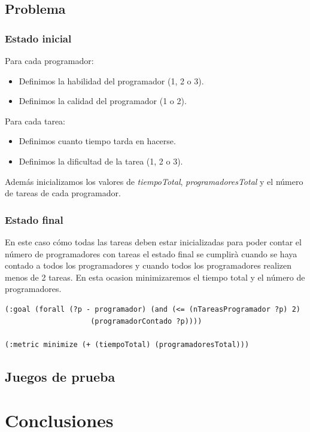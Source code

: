 \documentclass[11pt]{article}
\begin{document}
\subsection{Problema}
\subsubsection{Estado inicial}
Para cada programador:
\begin{itemize}
  	\item Definimos la habilidad del programador (1, 2 o 3).
  	\item Definimos la calidad del programador (1 o 2).
\end{itemize}

\noindent Para cada tarea:
\begin{itemize}
  	\item Definimos cuanto tiempo tarda en hacerse.
  	\item Definimos la dificultad de la tarea (1, 2 o 3).
\end{itemize}

\noindent Además inicializamos los valores de \textit{tiempoTotal}, \textit{programadoresTotal} y el número de tareas de cada programador. 

\subsubsection{Estado final}
En este caso cómo todas las tareas deben estar inicializadas para poder contar el número de programadores con tareas el estado final se cumplirà cuando se haya contado a todos los programadores y cuando todos los programadores realizen menos de 2 tareas.
En esta ocasion minimizaremos el tiempo total y el número de programadores.

\begin{verbatim}
(:goal (forall (?p - programador) (and (<= (nTareasProgramador ?p) 2)
					(programadorContado ?p))))
    
(:metric minimize (+ (tiempoTotal) (programadoresTotal)))
\end{verbatim}
\subsection{Juegos de prueba}


\section{Conclusiones}
\end{document}
